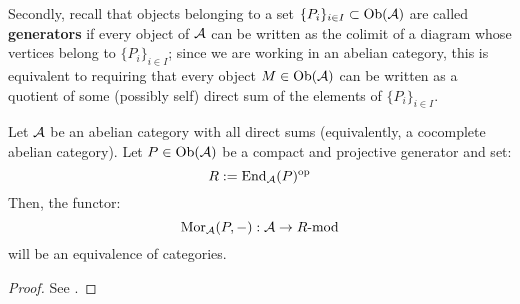         Secondly, recall that objects belonging to a set $\{P_i\}_{i \in I} \subset \mathrm{Ob}(\mathcal{A})$ are called \textbf{generators} if every object of $\mathcal{A}$ can be written as the colimit of a diagram whose vertices belong to $\{P_i\}_{i \in I}$; since we are working in an abelian category, this is equivalent to requiring that every object $M \in \mathrm{Ob}(\mathcal{A})$ can be written as a quotient of some (possibly self) direct sum of the elements of $\{P_i\}_{i \in I}$.
        \begin{lemma} \label{lemma: endomorphism_algebras_of_compact_projective_generators}
            Let $\mathcal{A}$ be an abelian category with all direct sums (equivalently, a cocomplete abelian category). Let $P \in \mathrm{Ob}(\mathcal{A})$ be a compact and projective generator and set:
                $$R := \operatorname{End}_{\mathcal{A}}(P)^{\mathrm{op}}$$
            Then, the functor:
                $$\mathrm{Mor}_{\mathcal{A}}(P, -): \mathcal{A} \to R\text{-}\mathrm{mod}$$
            will be an equivalence of categories.
        \end{lemma}
            \begin{proof}
                See \cite[Proposition 2.1.7]{ginzburg_lectures_on_noncommutative_geometry}.
            \end{proof}

